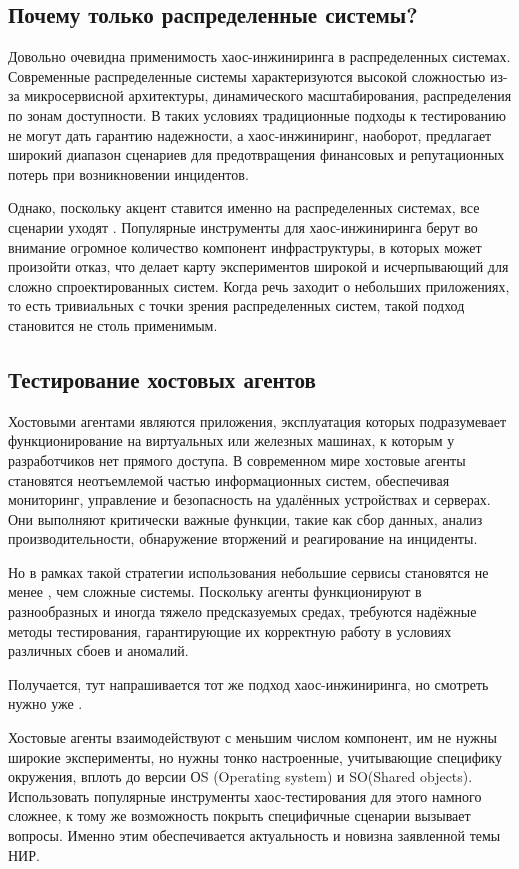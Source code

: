 \subsection{Почему только распределенные системы?}

Довольно очевидна применимость хаос-инжиниринга в распределенных системах.
Современные распределенные системы характеризуются высокой сложностью из-за микросервисной архитектуры,
динамического масштабирования, распределения по зонам доступности.
В таких условиях традиционные подходы к тестированию не могут дать гарантию надежности, а хаос-инжиниринг, наоборот,
предлагает широкий диапазон сценариев для предотвращения финансовых и репутационных потерь при возникновении инцидентов.

Однако, поскольку акцент ставится именно на распределенных системах, все сценарии уходят \glqq.
Популярные инструменты для хаос-инжиниринга берут во внимание огромное количество компонент инфраструктуры, в которых
может произойти отказ, что делает карту экспериментов широкой и исчерпывающий для сложно спроектированных систем.
Когда речь заходит о небольших приложениях, то есть тривиальных с точки зрения распределенных систем, такой подход
становится не столь применимым.

\subsection{Тестирование хостовых агентов}

Хостовыми агентами являются приложения, эксплуатация которых подразумевает функционирование на виртуальных или железных машинах,
к которым у разработчиков нет прямого доступа.
В современном мире хостовые агенты становятся неотъемлемой частью информационных систем, обеспечивая мониторинг,
управление и безопасность на удалённых устройствах и серверах.
Они выполняют критически важные функции, такие как сбор данных, анализ производительности, обнаружение вторжений
и реагирование на инциденты.

Но в рамках такой стратегии использования небольшие сервисы становятся не менее \glqq, чем сложные системы.
Поскольку агенты функционируют в разнообразных и иногда тяжело предсказуемых средах,
требуются надёжные методы тестирования, гарантирующие их корректную работу в условиях различных сбоев и аномалий.

Получается, тут напрашивается тот же подход хаос-инжиниринга, но смотреть нужно уже \glqq.

Хостовые агенты взаимодействуют с меньшим числом компонент, им не нужны широкие эксперименты, но нужны тонко настроенные,
учитывающие специфику окружения, вплоть до версии ОS (Operating system) и SO(Shared objects).
Использовать популярные инструменты хаос-тестирования для этого намного сложнее, к тому же возможность покрыть
специфичные сценарии вызывает вопросы.
Именно этим обеспечивается актуальность и новизна заявленной темы НИР.

